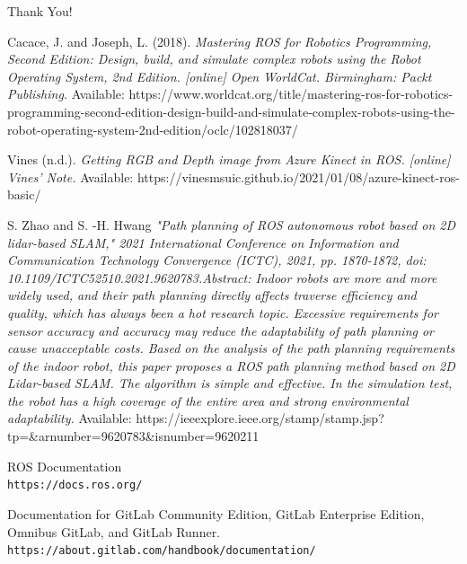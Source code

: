 \documentclass[twoside,12pt,times,onecolumn,a4paper]{report}
\begin{document}
\centering
Thank You!




\medskip

\appendix



\begin{thebibliography}{9}
Cacace, J. and Joseph, L. (2018). 
\textit{Mastering ROS for Robotics Programming, 
Second Edition: Design, build, and simulate complex robots using the Robot 
Operating System, 2nd Edition. [online] Open WorldCat. Birmingham: Packt 
Publishing. }
Available:  https://www.worldcat.org/title/mastering-ros-for-robotics-programming-second-edition-design-build-and-simulate-complex-robots-using-the-robot-operating-system-2nd-edition/oclc/102818037/

Vines (n.d.). 
\textit{Getting RGB and Depth image from Azure Kinect in ROS. [online] 
Vines’ Note.}
Available: https://vinesmsuic.github.io/2021/01/08/azure-kinect-ros-basic/


S. Zhao and S. -H. Hwang
\textit{"Path planning of ROS autonomous robot based on 2D lidar-based SLAM," 2021 International Conference on Information and Communication Technology Convergence (ICTC), 2021, pp. 1870-1872, doi: 10.1109/ICTC52510.2021.9620783.Abstract: Indoor robots are more and more widely used, and their path planning directly affects traverse efficiency and quality, which has always been a hot research topic. Excessive requirements for sensor accuracy and accuracy may reduce the adaptability of path planning or cause unacceptable costs. Based on the analysis of the path planning requirements of the indoor robot, this paper proposes a ROS path planning method based on 2D Lidar-based SLAM. The algorithm is simple and effective. In the simulation test, the robot has a high coverage of the entire area and strong environmental adaptability. }
Available: https://ieeexplore.ieee.org/stamp/stamp.jsp?tp=\&arnumber=9620783\&isnumber=9620211




ROS Documentation
\\\texttt{https://docs.ros.org/}

 Documentation for GitLab Community Edition, GitLab Enterprise Edition, Omnibus GitLab, and GitLab Runner.
\\\texttt{https://about.gitlab.com/handbook/documentation/}


\end{thebibliography}
\end{document}
